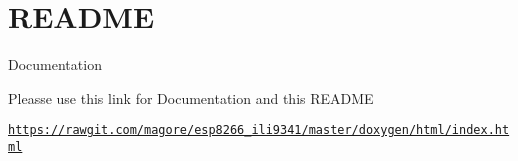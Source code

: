 \hypertarget{index_README}{}\section{R\-E\-A\-D\-M\-E}\label{index_README}
\begin{DoxyParagraph}{Documentation}

\end{DoxyParagraph}

\begin{DoxyItemize}
\item Pleasse use this link for Documentation and this R\-E\-A\-D\-M\-E
\begin{DoxyItemize}
\item \href{https://rawgit.com/magore/esp8266_ili9341/master/doxygen/html/index.html}{\tt https\-://rawgit.\-com/magore/esp8266\-\_\-ili9341/master/doxygen/html/index.\-html}
\end{DoxyItemize}
\end{DoxyItemize}

